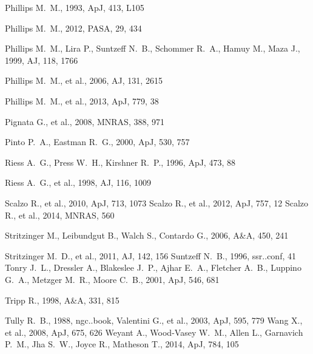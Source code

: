 \begin{thebibliography}{99}
Phillips M.~M., 1993, ApJ, 413, L105 

Phillips M.~M., 2012, PASA, 29, 434 

 Phillips M.~M., Lira P., Suntzeff N.~B., 
Schommer R.~A., Hamuy M., Maza J., 1999, AJ, 118, 1766 

 Phillips M.~M., et al., 2006, AJ, 131, 
2615 

 Phillips M.~M., et al., 2013, ApJ, 779, 38 

 Pignata G., et al., 2008, MNRAS, 388, 971 

 Pinto P.~A., Eastman R.~G., 2000, ApJ, 530, 757 

 Riess A.~G., Press W.~H., Kirshner R.~P., 1996, ApJ, 473, 88 

Riess A.~G., et al., 1998, AJ, 116, 1009 

Scalzo R., et al., 2010, ApJ, 713, 1073 
Scalzo R., et al., 2012, ApJ, 757, 12 
Scalzo R., et al., 2014, MNRAS, 560 



 Stritzinger M., Leibundgut B., Walch S.,
Contardo G., 2006, A\&A, 450, 241 

 Stritzinger M.~D., et al., 2011, AJ, 142, 
156 
Suntzeff N.~B., 1996, ssr..conf, 41 
Tonry J.~L., Dressler A., Blakeslee J.~P., Ajhar E.~A., Fletcher A.~B., 
Luppino G.~A., Metzger M.~R., Moore C.~B., 2001, ApJ, 546, 681

 Tripp R., 1998, A\&A, 331, 815 

 Tully 
R.~B., 1988, ngc..book,
 Valentini G., et al., 2003, ApJ, 595,
779 
Wang X., et al., 2008, ApJ, 675, 626 
Weyant A., Wood-Vasey W.~M., Allen L., Garnavich P.~M., Jha S.~W., Joyce 
R., Matheson T., 2014, ApJ, 784, 105 



\end{thebibliography}
